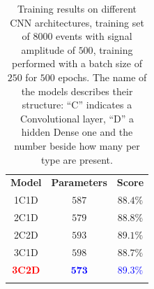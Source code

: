 \documentclass[prl,twocolumn]{revtex4-1}
\begin{document}
\begin{table}
    \centering
    \begin{tabular}{ccc}
        \toprule
        \textbf{Model} & \textbf{Parameters} & \textbf{Score}   \\
        \colrule
        1C1D & $587$ & $88.4\%$ \\
        2C1D & $579$ & $88.8\%$ \\ 
        2C2D & $593$ & $89.1\%$ \\ 
        3C1D & $598$ & $88.7\%$ \\ 
        \textcolor{red}{\bf 3C2D}  & 
        \textcolor{blue}{$\mathbf{573}$} & 
        \textcolor{blue}{$\mathbf{89.3\%}$} \\
        \botrule
    \end{tabular}
    \caption{Training results on different CNN architectures, training set of $8000$ events with signal amplitude of $500$, training performed with a batch size of $250$ for $500$ epochs. The name of the models describes their structure: ``C'' indicates a Convolutional layer, ``D'' a hidden Dense one and the number beside how many per type are present.}
    \label{tab:R_arch}
\end{table}

\end{document}
